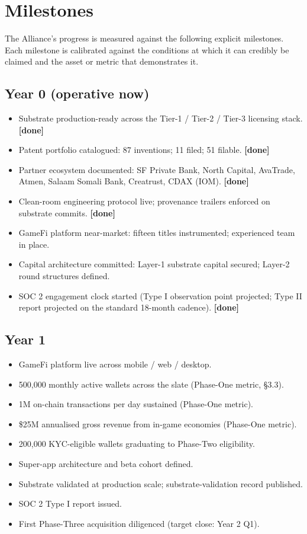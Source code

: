 \section{Milestones}

The Alliance's progress is measured against the following explicit
milestones. Each milestone is calibrated against the conditions at which
it can credibly be claimed and the asset or metric that demonstrates it.

\subsection{Year 0 (operative now)}

\begin{itemize}[leftmargin=2em,itemsep=0.1em]
\item Substrate production-ready across the Tier-1 / Tier-2 / Tier-3
licensing stack. \textbf{[done]}
\item Patent portfolio catalogued: 87 inventions; 11 filed; 51 filable.
\textbf{[done]}
\item Partner ecosystem documented: SF Private Bank, North Capital,
AvaTrade, Atmen, Salaam Somali Bank, Creatrust, CDAX (IOM).
\textbf{[done]}
\item Clean-room engineering protocol live; provenance trailers
enforced on substrate commits. \textbf{[done]}
\item GameFi platform near-market: fifteen titles instrumented;
experienced team in place.
\item Capital architecture committed: Layer-1 substrate capital
secured; Layer-2 round structures defined.
\item SOC 2 engagement clock started (Type I observation point
projected; Type II report projected on the standard 18-month cadence).
\textbf{[done]}
\end{itemize}

\subsection{Year 1}

\begin{itemize}[leftmargin=2em,itemsep=0.1em]
\item GameFi platform live across mobile / web / desktop.
\item 500,000 monthly active wallets across the slate (Phase-One
metric, \S 3.3).
\item 1M on-chain transactions per day sustained (Phase-One metric).
\item \$25M annualised gross revenue from in-game economies (Phase-One
metric).
\item 200,000 KYC-eligible wallets graduating to Phase-Two eligibility.
\item Super-app architecture and beta cohort defined.
\item Substrate validated at production scale; substrate-validation
record published.
\item SOC 2 Type I report issued.
\item First Phase-Three acquisition diligenced (target close: Year 2 Q1).
\end{itemize}

